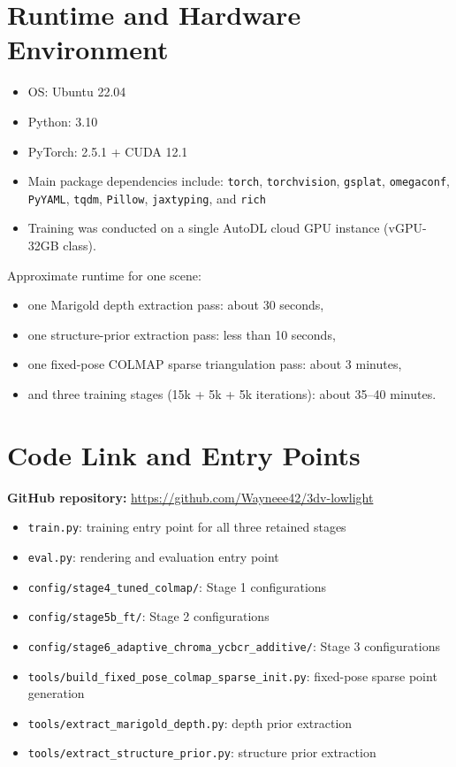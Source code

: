 \documentclass[10pt,a4paper]{article}
\begin{document}
\section{Runtime and Hardware Environment}
\begin{itemize}[leftmargin=2em]
  \item OS: Ubuntu 22.04
  \item Python: 3.10
  \item PyTorch: 2.5.1 + CUDA 12.1
  \item Main package dependencies include: \texttt{torch}, \texttt{torchvision}, \texttt{gsplat}, \texttt{omegaconf}, \texttt{PyYAML}, \texttt{tqdm}, \texttt{Pillow}, \texttt{jaxtyping}, and \texttt{rich}
  \item Training was conducted on a single AutoDL cloud GPU instance (vGPU-32GB class).
\end{itemize}

Approximate runtime for one scene:
\begin{itemize}[leftmargin=2em]
  \item one Marigold depth extraction pass: about 30 seconds,
  \item one structure-prior extraction pass: less than 10 seconds,
  \item one fixed-pose COLMAP sparse triangulation pass: about 3 minutes,
  \item and three training stages (15k + 5k + 5k iterations): about 35--40 minutes.
\end{itemize}

\section{Code Link and Entry Points}
\textbf{GitHub repository:} \url{https://github.com/Wayneee42/3dv-lowlight}

\begin{itemize}[leftmargin=2em]
  \item \texttt{train.py}: training entry point for all three retained stages
  \item \texttt{eval.py}: rendering and evaluation entry point
  \item \texttt{config/stage4\_tuned\_colmap/}: Stage 1 configurations
  \item \texttt{config/stage5b\_ft/}: Stage 2 configurations
  \item \texttt{config/stage6\_adaptive\_chroma\_ycbcr\_additive/}: Stage 3 configurations
  \item \texttt{tools/build\_fixed\_pose\_colmap\_sparse\_init.py}: fixed-pose sparse point generation
  \item \texttt{tools/extract\_marigold\_depth.py}: depth prior extraction
  \item \texttt{tools/extract\_structure\_prior.py}: structure prior extraction
\end{itemize}
\end{document}
